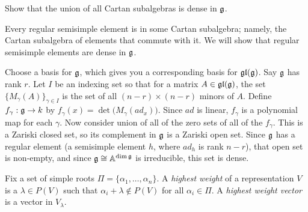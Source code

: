  \begin{exercise}
   Show that the union of all Cartan subalgebras is dense in $\mathfrak{g}$.
   \begin{solution}
     Every regular semisimple element is in some Cartan subalgebra; namely, the Cartan
     subalgebra of elements that commute with it. We will show that regular semisimple
     elements are dense in $\mathfrak{g}$.

     Choose a basis for $\mathfrak{g}$, which gives you a corresponding basis for $\mathfrak{gl}(\mathfrak{g})$. Say
     $\mathfrak{g}$ has rank $r$. Let $I$ be an indexing set so that for a matrix $A\in
     \mathfrak{gl}(\mathfrak{g})$, the set $\{M_\gamma(A)\}_{\gamma\in I}$ is the set of all $(n-r)\times
     (n-r)$ minors of $A$. Define $f_\gamma:\mathfrak{g}\to k$ by $ f_\gamma(x) =
     \det\bigl(M_\gamma(ad_x)\bigr)$. Since $ad$ is linear, $f_\gamma$ is a polynomial
     map for each $\gamma$. Now consider union of all of the zero sets of all of the
     $f_\gamma$. This is a Zariski closed set, so its complement in $\mathfrak{g}$ is a Zariski
     open set. Since $\mathfrak{g}$ has a regular element (a semisimple
     element $h$, where $ad_h$ is rank $n-r$), that open set is non-empty, and since
     $\mathfrak{g}\cong \mathbb{A}^{\dim \mathfrak{g}}$ is irreducible, this set is dense. 
   \end{solution}
 \end{exercise}

  Fix a set of simple roots $\Pi =
 \{\alpha_1,\dots,\alpha_n\}$. A \emph{highest weight} of
 a representation $V$ is a $\lambda\in P(V)$ such that $\alpha_i+\lambda \not\in
 P(V)$ for all $\alpha_i\in\Pi$. A \emph{highest weight vector} is a vector in
 $V_\lambda$.

